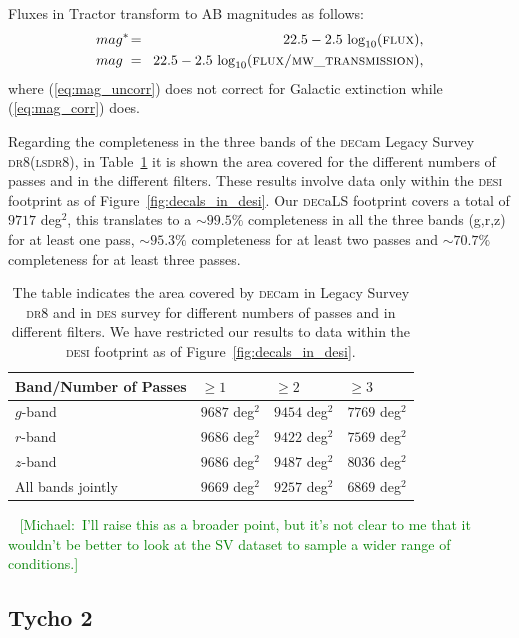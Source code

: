 \documentclass[fleqn,usenatbib]{mnras}
\newcommand{\mike}[1]{~\newline\noindent \textcolor{Green}{{ [Michael:~{#1}]\\}}}
\newcommand{\CORRFLUX}{{\textsc{flux/mw\_transmission}}\xspace}
\newcommand{\DECam}{\textsc{dec}am\xspace}
\newcommand{\DECaLS}{\textsc{dec}a\textsc{LS}\xspace}
\newcommand{\DESI}{\textsc{desi}\xspace}
\newcommand{\DES}{\textsc{des}\xspace}
\newcommand{\DReight}{\textsc{dr8}\xspace}
\newcommand{\FLUX}{{\textsc{flux}}\xspace}
\newcommand{\LS}{\textsc{ls}\xspace}
\newcommand{\TRACTOR}{\textsc{T}ractor\xspace}
\begin{document}
Fluxes in \TRACTOR transform to AB magnitudes as follows:
\begin{eqnarray}  
    mag^{*} \negthinspace &=& \negthinspace 22.5-2.5 \,\log_{10}(\FLUX) , \label{eq:mag_uncorr} \\
    mag^{\hphantom{*}}\negthinspace &=& \negthinspace 22.5 -2.5 \, \log_{10}(\CORRFLUX) , \label{eq:mag_corr}
\end{eqnarray}
where (\ref{eq:mag_uncorr}) does not correct for Galactic extinction while (\ref{eq:mag_corr}) does.

Regarding the completeness in the three bands of the \DECam Legacy Survey \DReight (\LS \DReight), in Table~\ref{tab:band_passes} it is shown the area covered for the different numbers of passes and in the different filters. These results involve data only within the \DESI footprint as of Figure~\ref{fig:decals_in_desi}. Our \DECaLS footprint covers a total of $9717$ deg$^2$, this translates to a $\sim 99.5 \%$ completeness in all the three bands (g,r,z) for at least one pass, $\sim 95.3 \%$ completeness for at least two passes and $\sim 70.7 \%$ completeness for at least three passes.

\begin{table}[h!]
\centering
\begin{tabular}{ |p{3cm}||p{1.4cm}|p{1.4cm}|p{1.4cm}|  }
 \hline
 {\bf Band/Number of Passes} & $\geq 1$ & $\geq 2$ & $\geq 3$\\
 \hline
 $g$-band   & $9687$ deg$^2$ & $9454$ deg$^2$ & $7769$ deg$^2$ \\
 $r$-band   & $9686$ deg$^2$ & $9422$ deg$^2$ & $7569$ deg$^2$ \\
 $z$-band   & $9686$ deg$^2$ & $9487$ deg$^2$ & $8036$ deg$^2$ \\
 All bands jointly & $9669$ deg$^2$ & $9257$ deg$^2$ & $6869$ deg$^2$ \\
 \hline
\end{tabular}
\caption{The table indicates the area covered by \DECam in Legacy Survey \DReight and in \DES survey for different numbers of passes and in different filters. We have restricted our results to data within the \DESI footprint as of Figure~\ref{fig:decals_in_desi}.}
\label{tab:band_passes}
\end{table}

\mike{I'll raise this as a broader point, but it's not clear to me that it wouldn't be better to look at the SV dataset to sample a wider range of conditions.}

\subsection{Tycho 2}
\end{document}
